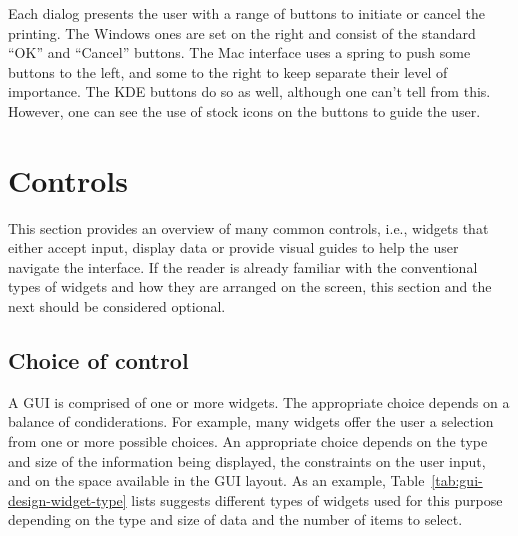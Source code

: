 Each dialog presents the user with a range of buttons to initiate or
cancel the printing. The Windows ones are set on the right and consist
of the standard ``OK'' and ``Cancel'' buttons. The Mac interface uses
a spring to push some buttons to the left, and some to the right to
keep separate their level of importance. The KDE buttons do so as
well, although one can't tell from this. However, one can see the use
of stock icons on the buttons to guide the user. 


\section{Controls}
\label{sec:GUI:basic-components}

This section provides an overview of many common controls, i.e.,
widgets that either accept input, display data or provide visual
guides to help the user navigate the interface. If the reader is
already familiar with the conventional types of widgets and how they
are arranged on the screen, this section and the next should be
considered optional.


\subsection{Choice of control}
\label{sec:choice-widget}

A GUI is comprised of one or more widgets. The appropriate choice
depends on a balance of condiderations.  For example, many widgets
offer the user a selection from one or more possible choices.  An
appropriate choice depends on the type and size of the information
being displayed, the constraints on the user input, and on the space
available in the GUI layout. As an example,
Table~\ref{tab:gui-design-widget-type} lists suggests different types
of widgets used for this purpose depending on the type and size of
data and the number of items to select.
  
